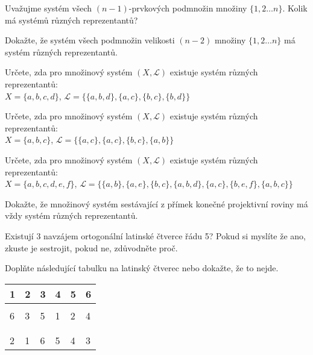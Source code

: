 \begin{t_exercise}
  \item Uvažujme systém všech $(n-1)$-prvkových podmnožin množiny $\{1, 2\dots n\}$. Kolik má systémů různých reprezentantů?
  \item Dokažte, že systém všech podmnožin velikosti $(n-2)$ množiny $\{1,2\dots n\}$ má systém různých reprezentantů.
  \item Určete, zda pro množinový systém $(X,\mathcal{L})$ existuje systém různých reprezentantů:\\
  $X=\{a,b,c,d\}$, $\mathcal{L}=\{\{a,b,d\}, \{a,c\}, \{b,c\}, \{b,d\}\}$
  \item Určete, zda pro množinový systém $(X,\mathcal{L})$ existuje systém různých reprezentantů:\\
  $X=\{a,b,c\}$, $\mathcal{L}=\{\{a,c\}, \{a,c\}, \{b,c\}, \{a,b\}\}$
  \item Určete, zda pro množinový systém $(X,\mathcal{L})$ existuje systém různých reprezentantů:\\
  $X=\{a,b,c,d,e,f\}$, $\mathcal{L}=\{\{a,b\}, \{a,e\}, \{b,c\}, \{a,b,d\}, \{a,c\}, \{b,e,f\}, \{a,b,c\}\}$
  \item Dokažte, že množinový systém sestávající z přímek konečné projektivní roviny má vždy systém různých reprezentantů.
  \item Existují 3 navzájem ortogonální latinské čtverce řádu 5? Pokud si myslíte že ano, zkuste je sestrojit, pokud ne, zdůvodněte proč.
  \item Doplňte následující tabulku na latinský čtverec nebo dokažte, že to nejde.
  \begin{table}[h]
    \centering
    \begin{tabular}{|l|l|l|l|l|l|}
      \hline
      1 & 2 & 3 & 4 & 5 & 6 \\ \hline
        &   &   &   &   &   \\ \hline
      6 & 3 & 5 & 1 & 2 & 4 \\ \hline
        &   &   &   &   &   \\ \hline
        &   &   &   &   &   \\ \hline
      2 & 1 & 6 & 5 & 4 & 3 \\ \hline
    \end{tabular}
  \end{table}
\end{t_exercise}